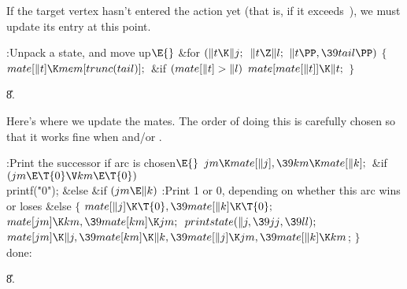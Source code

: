 If the target vertex hasn't entered the action yet (that is, if it
exceeds~), we must update its  entry at this point.

\Y\B\4:Unpack a state, and move  up\X${}\E{}$\6
\&{for} ${}(\|t\K\|j;{}$ ${}\|t\Z\|l;{}$ ${}\|t\PP,\39\\{tail}\PP){}$\5
${}\{{}$\1\6
${}\\{mate}[\|t]\K\\{mem}[\\{trunc}(\\{tail})];{}$\6
\&{if} ${}(\\{mate}[\|t]>\|l){}$\1\5
${}\\{mate}[\\{mate}[\|t]]\K\|t;{}$\2\6
\4${}\}{}$\2\par
\U8.\fi

Here's where we update the mates. The order of doing this is carefully
chosen so that it works fine when  and/or .

\Y\B\4:Print the successor if arc  is chosen\X${}\E{}$\6
$\\{jm}\K\\{mate}[\|j],\39\\{km}\K\\{mate}[\|k];{}$\6
\&{if} ${}(\\{jm}\E\T{0}\V\\{km}\E\T{0}){}$\1\5
\\{printf}(\.{"0"});\2\6
\&{else} \&{if} ${}(\\{jm}\E\|k){}$\1\5
:Print 1 or 0, depending on whether this arc wins or loses\X\2\6
\&{else}\5
${}\{{}$\1\6
${}\\{mate}[\|j]\K\T{0},\39\\{mate}[\|k]\K\T{0};{}$\6
${}\\{mate}[\\{jm}]\K\\{km},\39\\{mate}[\\{km}]\K\\{jm};{}$\6
${}\\{printstate}(\|j,\39\\{jj},\39\\{ll});{}$\6
${}\\{mate}[\\{jm}]\K\|j,\39\\{mate}[\\{km}]\K\|k,\39\\{mate}[\|j]\K\\{jm},\39%
\\{mate}[\|k]\K\\{km}{}$;\6
\4${}\}{}$\2\6
\\{done}:\par
\U8.\fi

